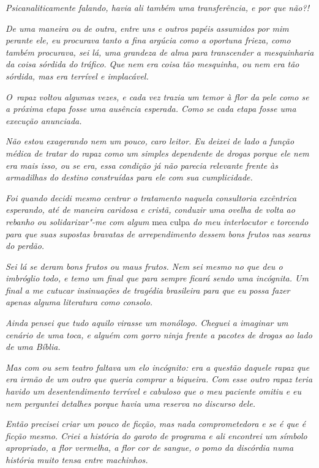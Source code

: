 \emph{Psicanaliticamente falando, havia ali também uma transferência, e
por que não?!}

\emph{De uma maneira ou de outra, entre uns e outros papéis assumidos
por mim perante ele, eu procurava tanto a fina argúcia como a oportuna
frieza, como também procurava, sei lá, uma grandeza de alma para
transcender a mesquinharia da coisa sórdida do tráfico. Que nem era
coisa tão mesquinha, ou nem era tão sórdida, mas era terrível e
implacável.}

\emph{O~rapaz voltou algumas vezes, e cada vez trazia um temor à flor da
pele como se a próxima etapa fosse uma ausência esperada. Como se cada
etapa fosse uma execução anunciada.}

\emph{Não estou exagerando nem um pouco, caro leitor. Eu deixei de lado
a função médica de tratar do rapaz como um simples dependente de drogas
porque ele nem era mais isso, ou se era, essa condição já não parecia
relevante frente às armadilhas do destino construídas para ele com sua
cumplicidade.}

\emph{Foi quando decidi mesmo centrar o tratamento naquela consultoria
excêntrica esperando, até de maneira caridosa e cristã, conduzir uma
ovelha de volta ao rebanho ou solidarizar"-me com algum} mea culpa \emph{do meu
interlocutor e torcendo para que suas supostas bravatas de
arrependimento dessem bons frutos nas searas do perdão.}

\emph{Sei lá se deram bons frutos ou maus frutos. Nem sei mesmo no que
deu o imbróglio todo, e temo um final que para sempre ficará sendo uma
incógnita. Um final a me cutucar insinuações de tragédia brasileira para
que eu possa fazer apenas alguma literatura como consolo.}

\emph{Ainda pensei que tudo aquilo virasse um monólogo. Cheguei a
imaginar um cenário de uma toca, e alguém com gorro ninja frente a
pacotes de drogas ao lado de uma Bíblia.}

\emph{Mas com ou sem teatro faltava um elo incógnito: era a questão
daquele rapaz que era irmão de um outro que queria comprar a biqueira.
Com esse outro rapaz teria havido um desentendimento terrível e cabuloso
que o meu paciente omitiu e eu nem perguntei detalhes porque havia uma
reserva no discurso dele.}

\emph{Então precisei criar um pouco de ficção, mas nada comprometedora e
se é que é ficção mesmo. Criei a história do garoto de programa e ali
encontrei um símbolo apropriado, a flor vermelha, a flor cor de sangue,
o pomo da discórdia numa história muito tensa entre machinhos.}

